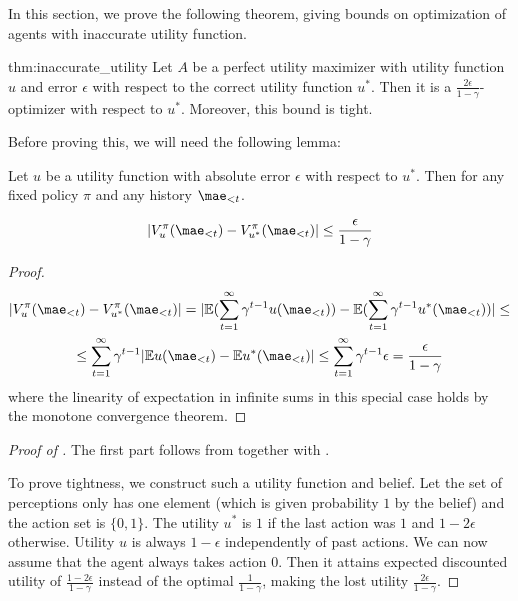 In this section, we prove the following theorem, giving bounds on optimization of agents with inaccurate utility function.
\begin{repeatthm}{thm:inaccurate_utility}
Let $A$ be a perfect utility maximizer with utility function $u$ and error $\epsilon$ with respect to the correct utility function $u^*$. Then it is a $\frac{2\epsilon}{1-\gamma}$-optimizer with respect to $u^*$. Moreover, this bound is tight.
\end{repeatthm}
Before proving this, we will need the following lemma:
\begin{lemma} \label{lem:utility_bound}
Let $u$ be a utility function with absolute error $\epsilon$ with respect to $u^*$. Then for any fixed policy $\pi$ and any history $\mae_{<t}$.

\[
|V_u^\pi(\mae_{<t}) - V_{u^*}^\pi(\mae_{<t})| \leq \frac{\epsilon}{1-\gamma}
\]
\end{lemma}
\begin{proof}
\begin{gather}
|V_u^\pi(\mae_{<t}) - V_{u^*}^\pi(\mae_{<t})| = |\mathbb{E}(\sum_{t=1}^\infty \gamma^{t-1} u(\mae_{<t})) - \mathbb{E}(\sum_{t=1}^\infty \gamma^{t-1} u^*(\mae_{<t}))| \leq \\
\leq \sum_{t=1}^\infty \gamma^{t-1} |\mathbb{E} u(\mae_{<t}) - \mathbb{E} u^*(\mae_{<t})| \leq \sum_{t=1}^\infty \gamma^{t-1} \epsilon = \frac{\epsilon}{1-\gamma}
\end{gather}
where the linearity of expectation in infinite sums in this special case holds by the monotone convergence theorem.

\end{proof}

\begin{proof}[Proof of ]
The first part follows from  together with .

To prove tightness, we construct such a utility function and belief. Let the set of perceptions only has one element (which is given probability $1$ by the belief) and the action set is $\{0,1\}$. The utility $u^*$ is $1$ if the last action was $1$ and $1-2\epsilon$ otherwise. Utility $u$ is always $1-\epsilon$ independently of past actions. We can now assume that the agent always takes action $0$. Then it attains expected discounted utility of $\frac{1-2\epsilon}{1-\gamma}$ instead of the optimal $\frac{1}{1-\gamma}$, making the lost utility $\frac{2\epsilon}{1-\gamma}$.
\end{proof}
